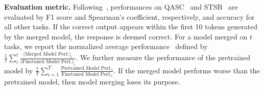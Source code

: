 \noindent\textbf{Evaluation metric.} Following~\citet{tang2024fusionbench,bruel2024compress}, performances on QASC~\cite{allenai:qasc} and STSB~\cite{cer2017semeval} are evaluated by F1 score and Spearman's coefficient, respectively,
and accuracy for all other tasks. 
If the correct output appears within the first 10 tokens generated by the merged model, the response is deemed correct.
For a model merged on \(t\) tasks, we report the normalized average performance~\cite{ilharco2022editing,yadav2024ties} defined by $\frac{1}{t} \sum_{i}^{t} \frac{\text{(Merged Model Perf.)}_{i}}{\text{(Finetuned Model Perf.)}_{i}}$. We further measure the performance of the pretrained model by $\frac{1}{T} \sum_{i=1}^{T} \frac{\text{Pretrained Model Perf.}_{i}}{\text{Finetuned Model Perf.}_{i}}$. If the merged model performs worse than the pretrained model, then model merging loses its purpose. 





